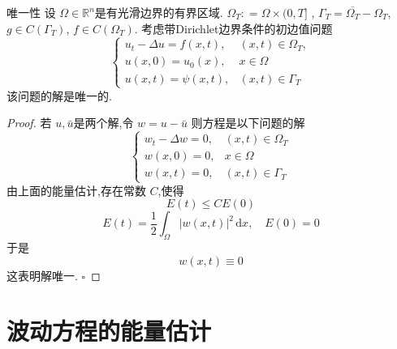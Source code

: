 \documentclass[../../main.tex]{subfiles}
\begin{document}
\begin{corollary}{唯一性}
    设 \(   \Omega \in \mathbb{R} ^{n}  \)是有光滑边界的有界区域. \(   \Omega _{T}: =   \Omega \times (0,T]  \)    , \(   \Gamma _{T}=  \overline{ \Omega _{T}}- \Omega _{T}  \), \(  g \in C\left(  \Gamma _{T} \right)   \), \(  f \in C\left(  \Omega _{T} \right)   \). 考虑带Dirichlet边界条件的初边值问题 \[
\begin{cases} u_{t}- \Delta u= f\left( x,t \right) ,&\left( x,t \right)\in  \Omega _{T},\\ 
 u \left( x,0 \right)= u_0\left( x \right),& x\in  \Omega \\ 
  u\left( x,t \right)= \psi \left( x,t \right) ,&\left( x,t \right) \in  \Gamma _{T}    \end{cases} 
\]该问题的解是唯一的.
\end{corollary}
\begin{proof}
    若 \(  u,\bar{u}  \)是两个解,令 \(  w = u-\bar{u}  \)  
    则方程是以下问题的解 \[
    \begin{cases} w_{t}- \Delta w= 0,&\left( x,t \right)\in  \Omega _{T}\\ 
     w\left( x,0 \right)= 0,&x\in  \Omega \\ 
      w\left( x,t \right)= 0,&\left( x,t \right)\in  \Gamma _{T}     \end{cases} 
    \]由上面的能量估计,存在常数 \(  C  \),使得 \[
    E\left( t \right)\le CE\left( 0 \right)  
    \] \[
    E\left( t \right)= \frac{1}{2}\int_{ \Omega }\left| w\left( x,t \right)  \right|^{2}\,\mathrm{d} x,\quad E\left( 0 \right)= 0   
    \]于是 \[
    w\left( x,t \right)\equiv 0 
    \]这表明解唯一.
    \hfill $\square$
\end{proof}

\section{波动方程的能量估计}
\end{document}
